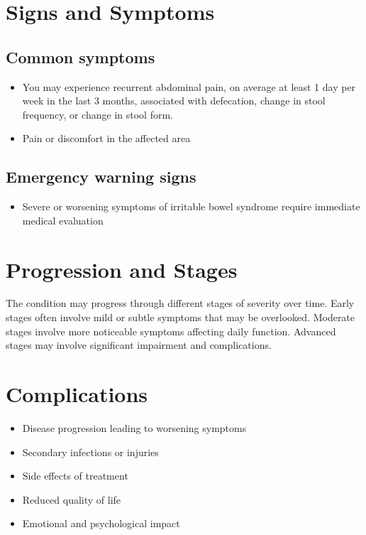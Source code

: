 \section{Signs and Symptoms}

\subsection{Common symptoms}
\begin{itemize}[noitemsep]
  \item You may experience recurrent abdominal pain, on average at least 1 day per week in the last 3 months, associated with defecation, change in stool frequency, or change in stool form.

  \item Pain or discomfort in the affected area
  \end{itemize}

\subsection{Emergency warning signs}
\begin{itemize}[noitemsep]
  \item Severe or worsening symptoms of irritable bowel syndrome require immediate medical evaluation
\end{itemize}
\section{Progression and Stages}
The condition may progress through different stages of severity over time. Early stages often involve mild or subtle symptoms that may be overlooked. Moderate stages involve more noticeable symptoms affecting daily function. Advanced stages may involve significant impairment and complications.
\section{Complications}
\begin{itemize}[noitemsep]
  \item Disease progression leading to worsening symptoms
  \item Secondary infections or injuries
  \item Side effects of treatment
  \item Reduced quality of life
  \item Emotional and psychological impact
\end{itemize}
